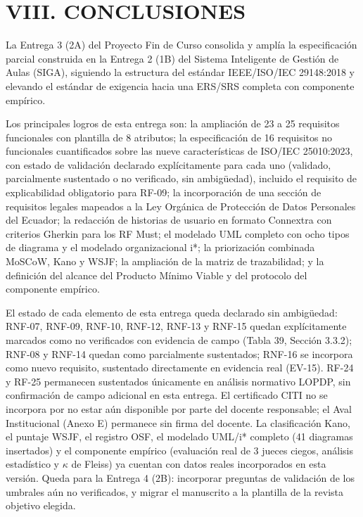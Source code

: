\section*{VIII. CONCLUSIONES}


La Entrega 3 (2A) del Proyecto Fin de Curso consolida y amplía la especificación parcial construida en la Entrega 2 (1B) del Sistema Inteligente de Gestión de Aulas (SIGA), siguiendo la estructura del estándar IEEE/ISO/IEC 29148:2018 y elevando el estándar de exigencia hacia una ERS/SRS completa con componente empírico.


Los principales logros de esta entrega son: la ampliación de 23 a 25 requisitos funcionales con plantilla de 8 atributos; la especificación de 16 requisitos no funcionales cuantificados sobre las nueve características de ISO/IEC 25010:2023, con estado de validación declarado explícitamente para cada uno (validado, parcialmente sustentado o no verificado, sin ambigüedad), incluido el requisito de explicabilidad obligatorio para RF-09; la incorporación de una sección de requisitos legales mapeados a la Ley Orgánica de Protección de Datos Personales del Ecuador; la redacción de historias de usuario en formato Connextra con criterios Gherkin para los RF Must; el modelado UML completo con ocho tipos de diagrama y el modelado organizacional i*; la priorización combinada MoSCoW, Kano y WSJF; la ampliación de la matriz de trazabilidad; y la definición del alcance del Producto Mínimo Viable y del protocolo del componente empírico.


El estado de cada elemento de esta entrega queda declarado sin ambigüedad: RNF-07, RNF-09, RNF-10, RNF-12, RNF-13 y RNF-15 quedan explícitamente marcados como no verificados con evidencia de campo (Tabla 39, Sección 3.3.2); RNF-08 y RNF-14 quedan como parcialmente sustentados; RNF-16 se incorpora como nuevo requisito, sustentado directamente en evidencia real (EV-15). RF-24 y RF-25 permanecen sustentados únicamente en análisis normativo LOPDP, sin confirmación de campo adicional en esta entrega. El certificado CITI no se incorpora por no estar aún disponible por parte del docente responsable; el Aval Institucional (Anexo E) permanece sin firma del docente. La clasificación Kano, el puntaje WSJF, el registro OSF, el modelado UML/i* completo (41 diagramas insertados) y el componente empírico (evaluación real de 3 jueces ciegos, análisis estadístico y $\kappa$ de Fleiss) ya cuentan con datos reales incorporados en esta versión. Queda para la Entrega 4 (2B): incorporar preguntas de validación de los umbrales aún no verificados, y migrar el manuscrito a la plantilla de la revista objetivo elegida.


